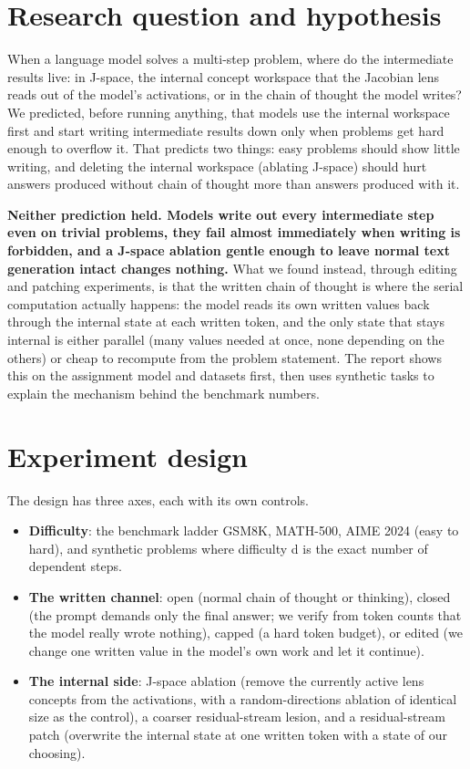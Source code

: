 \providecommand{\tightlist}{\setlength{\itemsep}{2pt}\setlength{\parskip}{0pt}}
\section{Research question and
hypothesis}\label{research-question-and-hypothesis}

When a language model solves a multi-step problem, where do the
intermediate results live: in J-space, the internal concept workspace
that the Jacobian lens reads out of the model's activations, or in the
chain of thought the model writes? We predicted, before running
anything, that models use the internal workspace first and start writing
intermediate results down only when problems get hard enough to overflow
it. That predicts two things: easy problems should show little writing,
and deleting the internal workspace (ablating J-space) should hurt
answers produced without chain of thought more than answers produced
with it.

\textbf{Neither prediction held. Models write out every intermediate
step even on trivial problems, they fail almost immediately when writing
is forbidden, and a J-space ablation gentle enough to leave normal text
generation intact changes nothing.} What we found instead, through
editing and patching experiments, is that the written chain of thought
is where the serial computation actually happens: the model reads its
own written values back through the internal state at each written
token, and the only state that stays internal is either parallel (many
values needed at once, none depending on the others) or cheap to
recompute from the problem statement. The report shows this on the
assignment model and datasets first, then uses synthetic tasks to
explain the mechanism behind the benchmark numbers.

\section{Experiment design}\label{experiment-design}

The design has three axes, each with its own controls.

\begin{itemize}
\tightlist
\item
  \textbf{Difficulty}: the benchmark ladder GSM8K, MATH-500, AIME 2024
  (easy to hard), and synthetic problems where difficulty d is the exact
  number of dependent steps.
\item
  \textbf{The written channel}: open (normal chain of thought or
  thinking), closed (the prompt demands only the final answer; we verify
  from token counts that the model really wrote nothing), capped (a hard
  token budget), or edited (we change one written value in the model's
  own work and let it continue).
\item
  \textbf{The internal side}: J-space ablation (remove the currently
  active lens concepts from the activations, with a random-directions
  ablation of identical size as the control), a coarser residual-stream
  lesion, and a residual-stream patch (overwrite the internal state at
  one written token with a state of our choosing).
\end{itemize}

